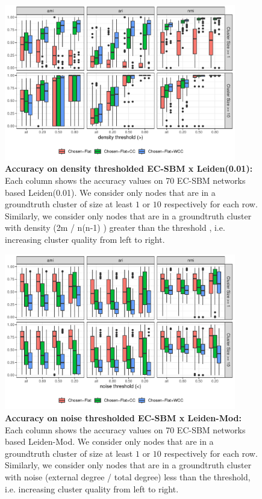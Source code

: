 \documentclass[aps,pre,superscriptaddress]{article}
\begin{document}
\begin{figure}[!htpb]
    \centering
    \includegraphics[width=0.9\textwidth]{figures/density_acc_leiden.01.pdf}
    \caption[]{\textbf{Accuracy on density thresholded EC-SBM x Leiden(0.01):} 
        Each column shows the accuracy values on 70 EC-SBM networks based Leiden(0.01). 
        We consider only nodes that are in a groundtruth cluster of size at least $1$ or $10$ respectively for each row.
        Similarly, we consider only nodes that are in a groundtruth cluster with density (2m / n(n-1) ) greater than the threshold , i.e. increasing cluster quality from left to right. }
\end{figure}

\begin{figure}[!htpb]
    \centering
    \includegraphics[width=0.9\textwidth]{figures/noise_acc_leidenmod.pdf}
    \caption[]{\textbf{Accuracy on noise thresholded EC-SBM x Leiden-Mod:} 
        Each column shows the accuracy values on 70 EC-SBM networks based Leiden-Mod. 
        We consider only nodes that are in a groundtruth cluster of size at least $1$ or $10$ respectively for each row.
        Similarly, we consider only nodes that are in a groundtruth cluster with noise (external degree / total degree) less than the threshold, i.e. increasing cluster quality from left to right. }
\end{figure}
\end{document}
